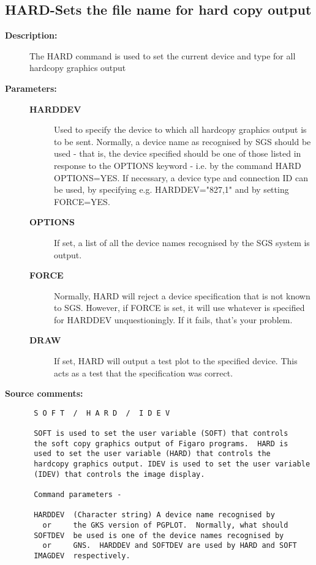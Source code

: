 \subsection{HARD-\label{HARD}Sets the file name for hard copy output}
\begin{description}

\item [{\bf Description:}]
 The HARD command is used to set the current device and type
 for all hardcopy graphics output

\item [{\bf Parameters:}]
\begin{description}
\item [{\bf HARDDEV}]
 Used to specify the device to which all hardcopy graphics
 output is to be sent.  Normally, a device name as
 recognised by SGS should be used - that is, the device
 specified should be one of those listed in response to the
 OPTIONS keyword - i.e. by the command HARD OPTIONS=YES. If
 necessary, a device type and connection ID can be used, by
 specifying e.g. HARDDEV="827,1" and by setting FORCE=YES.
\item [{\bf OPTIONS}]
 If set, a list of all the device names recognised by
 the SGS system is output.
\item [{\bf FORCE}]
 Normally, HARD will reject a device specification that is
 not known to SGS.  However, if FORCE is set, it will use
 whatever is specified for HARDDEV unquestioningly.  If it
 fails, that's your problem.
\item [{\bf DRAW}]
 If set, HARD will output a test plot to the specified
 device.  This acts as a test that the specification was
 correct.
\end{description}

\item [{\bf Source comments:}]
\begin{verbatim}
 S O F T  /  H A R D  /  I D E V

 SOFT is used to set the user variable (SOFT) that controls
 the soft copy graphics output of Figaro programs.  HARD is
 used to set the user variable (HARD) that controls the
 hardcopy graphics output. IDEV is used to set the user variable
 (IDEV) that controls the image display.

 Command parameters -

 HARDDEV  (Character string) A device name recognised by
   or     the GKS version of PGPLOT.  Normally, what should
 SOFTDEV  be used is one of the device names recognised by
   or     GNS.  HARDDEV and SOFTDEV are used by HARD and SOFT
 IMAGDEV  respectively.


\end{verbatim}
\end{description}

